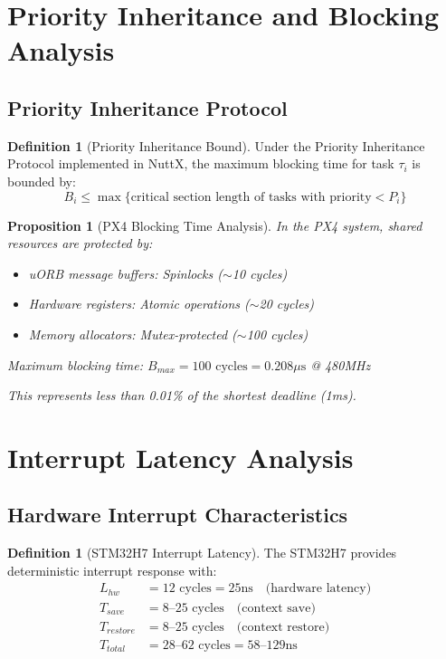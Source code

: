 \documentclass[11pt,a4paper]{article}
\newtheorem{proposition}[theorem]{Proposition}
\theoremstyle{definition}
\newtheorem{definition}[theorem]{Definition}
\theoremstyle{remark}
\begin{document}
\section{Priority Inheritance and Blocking Analysis}

\subsection{Priority Inheritance Protocol}

\begin{definition}[Priority Inheritance Bound]
Under the Priority Inheritance Protocol implemented in NuttX, the maximum blocking time for task $\tau_i$ is bounded by:
\begin{equation}
B_i \leq \max\{\text{critical section length of tasks with priority} < P_i\}
\end{equation}
\end{definition}

\begin{proposition}[PX4 Blocking Time Analysis]
In the PX4 system, shared resources are protected by:
\begin{itemize}
    \item uORB message buffers: Spinlocks ($\sim$10 cycles)
    \item Hardware registers: Atomic operations ($\sim$20 cycles)
    \item Memory allocators: Mutex-protected ($\sim$100 cycles)
\end{itemize}

Maximum blocking time: $B_{max} = 100 \text{ cycles} = 0.208\mu\text{s}$ @ 480MHz

This represents less than 0.01\% of the shortest deadline (1ms).
\end{proposition}

\section{Interrupt Latency Analysis}

\subsection{Hardware Interrupt Characteristics}

\begin{definition}[STM32H7 Interrupt Latency]
The STM32H7 provides deterministic interrupt response with:
\begin{align}
L_{hw} &= 12 \text{ cycles} = 25\text{ns} \quad \text{(hardware latency)} \\
T_{save} &= 8\text{--}25 \text{ cycles} \quad \text{(context save)} \\
T_{restore} &= 8\text{--}25 \text{ cycles} \quad \text{(context restore)} \\
T_{total} &= 28\text{--}62 \text{ cycles} = 58\text{--}129\text{ns}
\end{align}
\end{definition}
\end{document}
